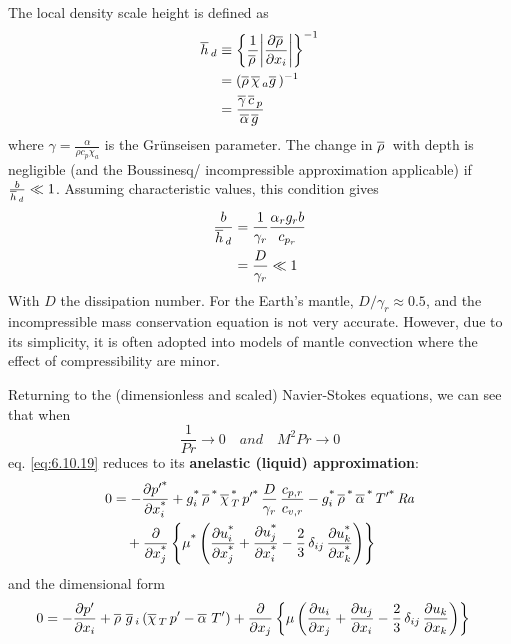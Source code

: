 \documentclass[document.tex]{subfiles}
\begin{document}
The local density scale height is defined as 
\begin{align}
    \begin{split}
        \overline{h}\,_d &\equiv \left\{\frac{1}{\overline{\rho}\,} \abs{\pdv{\overline{\rho}\,}{x_i}} \right\}^{-1} \\
    &= (\overline{\rho}\,\overline{\chi}\,_a\overline{g}\,)^{-1} \\
    &=\frac{\overline{\gamma}\,\overline{c}\,_p}{\overline{\alpha}\,\overline{g}\,}\\
    \end{split}
\end{align}
where $\gamma = \frac{\alpha}{\rho c_p \chi_a}$ is the Grünseisen parameter. 
The change in $\overline{\rho}\,$ with depth is negligible (and the Boussinesq/ incompressible approximation applicable) if $\frac{b}{\overline{h}\,_d} \ll 1$. 
Assuming characteristic values, this condition gives
\begin{align}
    \begin{split}
        \frac{b}{\overline{h}\,_d} &= \frac{1}{\gamma_r}\frac{\alpha_rg_rb}{c_{p_r}} \\
    &= \frac{D}{\gamma_r} \ll 1
    \end{split}
\end{align} 
With $D$ the dissipation number. For the Earth's mantle, $D/\gamma_r \approx 0.5$, and
the incompressible mass conservation equation is not very accurate. However, due to its simplicity, 
it is often adopted into models of mantle convection where the effect of compressibility are minor. 

Returning to the (dimensionless and scaled) Navier-Stokes equations, we can see that when
\begin{equation}
    \frac{1}{Pr} \to 0 \quad and \quad   M^2Pr \to 0
\end{equation}
eq. \ref{eq:6.10.19} reduces to its \textbf{anelastic (liquid) approximation}:
\begin{align}
  0 &= - \pdv{\ensuremath p'^{\textup{*}}}{\ensuremath x_i^{\textup{*}}}
    + g_i^{\textup{*}}\,\overline{\rho}\,^{\textup{*}}\,\overline{\chi}\,_{T}^{\textup{*}}\, p'^{\textup{*}}\,
      \frac{D}{\gamma_r}\,\frac{c_{p,r}}{c_{v,r}}
    - g_i^{\textup{*}}\,\overline{\rho}\,^{\textup{*}}\,\overline{\alpha}\,^{\textup{*}}\, T'^{\textup{*}}\, \mathit{Ra}
    \nonumber \\
  &\quad + \pdv{\ensuremath x_j^{\textup{*}}}
    \left\{ \mu^{\textup{*}}
    \left( \pdv{\ensuremath u_i^{\textup{*}}}{\ensuremath x_j^{\textup{*}}} + \pdv{\ensuremath u_j^{\textup{*}}}{\ensuremath x_i^{\textup{*}}}
    - \frac{2}{3}\,\delta_{ij}\,\pdv{\ensuremath u_k^{\textup{*}}}{\ensuremath x_k^{\textup{*}}} \right)
    \right\}
  \label{eq:6.10.21}
\end{align}
and the dimensional form 
\begin{align}
  0 &= - \pdv{p'}{x_i}
    + \overline{\rho}\,\,\overline{g}\,_i
      \left( \overline{\chi}\,_{T}\, p' - \overline{\alpha}\,\, T' \right)
    + \pdv{x_j}
    \left\{ \mu
    \left( \pdv{u_i}{x_j} + \pdv{u_j}{x_i}
    - \frac{2}{3}\,\delta_{ij}\,\pdv{u_k}{x_k} \right)
    \right\}
  \label{eq:6.10.22}
\end{align}
\end{document}
